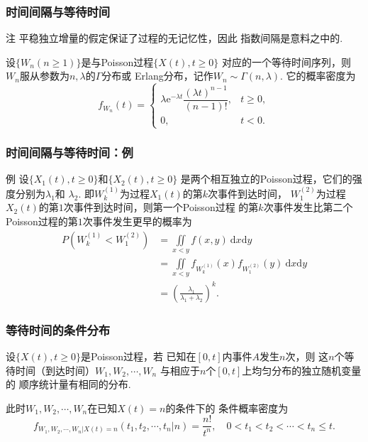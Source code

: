 \begin{frame}
    \frametitle{时间间隔与等待时间}
    \begin{block}{注}
        平稳独立增量的假定保证了过程的无记忆性，因此
        指数间隔是意料之中的.
    \end{block}

    \begin{mytheorem}[等待时间的分布]
        设$\{W_n(n\geqslant 1)\}$是与Poisson过程$\{X(t),t\geqslant 0\}$
        对应的一个等待时间序列，则$W_n$服从参数为$n,\lambda$的$\Gamma$分布或
        Erlang分布，记作$W_n\sim\Gamma(n,\lambda)$. 它的概率密度为
        \begin{equation}
            f_{W_n}(t)=
            \begin{cases}
                \lambda \mathrm e^{-\lambda t}\dfrac{(\lambda t)^{n-1}}{(n-1)!},&t\geqslant 0,\\
                0,&t<0.
            \end{cases}
        \end{equation}
    \end{mytheorem}
\end{frame}

\begin{frame}
    \frametitle{时间间隔与等待时间：例}
    \begin{exampleblock}{例}
        设$\{X_1(t),t\geqslant0\}$和$\{X_2(t),t\geqslant 0\}$
        是两个相互独立的Poisson过程，它们的强度分别为$\lambda_1$和
        $\lambda_2$. 即$W_k^{(1)}$为过程$X_1(t)$的第$k$次事件到达时间，
        $W_1^{(2)}$为过程$X_2(t)$的第$1$次事件到达时间，则第一个Poisson过程
        的第$k$次事件发生比第二个Poisson过程的第$1$次事件发生更早的概率为
        \begin{align}
            P\left(W_k^{(1)}<W_1^{(2)}\right)
            &=\iint\limits_{x<y}f(x,y)\ \mathrm dx\mathrm dy\nonumber\\
            &=\iint\limits_{x<y}f_{W_k^{(1)}}(x)f_{W_1^{(2)}}(y)\ \mathrm dx\mathrm dy\nonumber\\
            &=\left(\frac{\lambda_1}{\lambda_1+\lambda_2}\right)^k.
        \end{align}
    \end{exampleblock}
\end{frame}

\begin{frame}
    \frametitle{等待时间的条件分布}
    \begin{mytheorem}[等待时间的条件分布]
        设$\{X(t),t\geqslant 0\}$是Poisson过程，若
        已知在$[0,t]$内事件$A$发生$n$次，则
        这$n$个等待时间（到达时间）$W_1,W_2,\cdots,W_n$
        与相应于$n$个$[0,t]$上均匀分布的独立随机变量的
        顺序统计量有相同的分布.

        此时$W_1,W_2,\cdots,W_n$在已知$X(t)=n$的条件下的
        条件概率密度为
        \begin{equation}
            f_{W_1,W_2,\cdots,W_n|X(t)=n}(t_1,t_2,\cdots,t_n|n)=\frac{n!}{t^n},\quad 0<t_1<t_2<\cdots<t_n\leqslant t.
        \end{equation}
    \end{mytheorem}
\end{frame}

